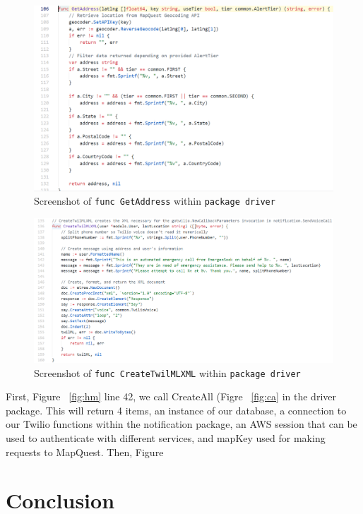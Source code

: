 \documentclass[10pt, a4paper]{article}
\begin{document}
\begin{figure}[H]
  \includegraphics[scale=.6]{code-screenshots/get-address.png}
  \caption{Screenshot of \texttt{func GetAddress} within \texttt{package driver}}\label{fig:ga}
\end{figure}

\begin{figure}[H]
  \includegraphics[scale=.6]{code-screenshots/create-twilml.png}
  \caption{Screenshot of \texttt{func CreateTwilMLXML} within \texttt{package driver}}\label{fig:ct}
\end{figure}

First, Figure ~\ref{fig:hm} line 42, we call CreateAll (Figre ~\ref{fig:ca} in the driver package. This will return 4 items, an instance of our database, a connection to our Twilio functions within the notification package, an AWS session that can be used to authenticate with different services, and mapKey used for making requests to MapQuest. Then, Figure

\section{Conclusion}
\end{document}
